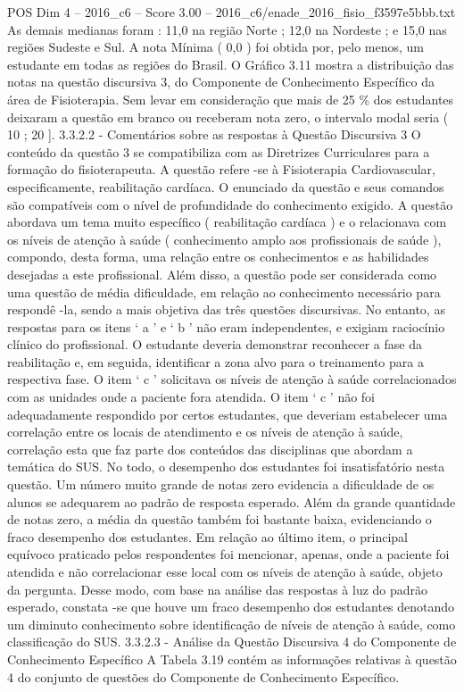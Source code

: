 \begin{textsample}{POS Dim 4 – 2016\_c6 – Score 3.00 – 2016\_c6/enade\_2016\_fisio\_f3597e5bbb.txt}
As demais medianas foram : 11,0 na região Norte ; 12,0 na Nordeste ; e 15,0 nas regiões Sudeste e Sul.
A nota Mínima ( 0,0 ) foi obtida por, pelo menos, um estudante em todas as regiões do Brasil.
O Gráfico 3.11 mostra a distribuição das notas na questão discursiva 3, do Componente de Conhecimento Específico da área de Fisioterapia.
Sem levar em consideração que mais de 25 \% dos estudantes deixaram a questão em branco ou receberam nota zero, o intervalo modal seria ( 10 ; 20 ]. 3.3.2.2 - Comentários sobre as respostas à Questão Discursiva 3 O conteúdo da questão 3 se compatibiliza com as Diretrizes Curriculares para a formação do fisioterapeuta.
A questão refere -se à Fisioterapia Cardiovascular, especificamente, reabilitação cardíaca.
O enunciado da questão e seus comandos são compatíveis com o nível de profundidade do conhecimento exigido.
A questão abordava um tema muito específico ( reabilitação cardíaca ) e o relacionava com os níveis de atenção à saúde ( conhecimento amplo aos profissionais de saúde ), compondo, desta forma, uma relação entre os conhecimentos e as habilidades desejadas a este profissional.
Além disso, a questão pode ser considerada como uma questão de média dificuldade, em relação ao conhecimento necessário para respondê -la, sendo a mais objetiva das três questões discursivas.
No entanto, as respostas para os itens ‘ a ’ e ‘ b ’ não eram independentes, e exigiam raciocínio clínico do profissional.
O estudante deveria demonstrar reconhecer a fase da reabilitação e, em seguida, identificar a zona alvo para o treinamento para a respectiva fase.
O item ‘ c ’ solicitava os níveis de atenção à saúde correlacionados com as unidades onde a paciente fora atendida.
O item ‘ c ’ não foi adequadamente respondido por certos estudantes, que deveriam estabelecer uma correlação entre os locais de atendimento e os níveis de atenção à saúde, correlação esta que faz parte dos conteúdos das disciplinas que abordam a temática do SUS.
No todo, o desempenho dos estudantes foi insatisfatório nesta questão.
Um número muito grande de notas zero evidencia a dificuldade de os alunos se adequarem ao padrão de resposta esperado.
Além da grande quantidade de notas zero, a média da questão também foi bastante baixa, evidenciando o fraco desempenho dos estudantes.
Em relação ao último item, o principal equívoco praticado pelos respondentes foi mencionar, apenas, onde a paciente foi atendida e não correlacionar esse local com os níveis de atenção à saúde, objeto da pergunta.
Desse modo, com base na análise das respostas à luz do padrão esperado, constata -se que houve um fraco desempenho dos estudantes denotando um diminuto conhecimento sobre identificação de níveis de atenção à saúde, como classificação do SUS. 3.3.2.3 - Análise da Questão Discursiva 4 do Componente de Conhecimento Específico A Tabela 3.19 contém as informações relativas à questão 4 do conjunto de questões do Componente de Conhecimento Específico.

\end{textsample}
